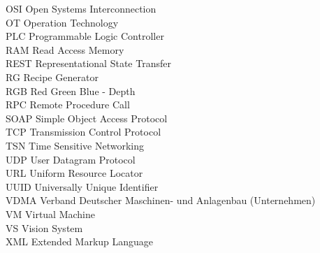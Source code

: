 \begin{tabbing}
OSI     \>  Open Systems Interconnection\\
OT  \> Operation Technology\\
PLC  \> Programmable Logic Controller\\
RAM    \> Read Access Memory \\
REST    \> Representational State Transfer \\
RG    \> Recipe Generator \\
RGB    \> Red Green Blue - Depth \\
RPC    \> Remote Procedure Call \\
SOAP	 \> 	Simple Object Access Protocol	 \\
TCP	 \> 	Transmission Control Protocol	 \\
TSN	 \> 	Time Sensitive Networking	 \\
UDP	 \> 	User Datagram Protocol	 \\
URL	 \> 	Uniform Resource Locator	 \\
UUID	 \> 	Universally Unique Identifier	 \\
VDMA \>     Verband Deutscher Maschinen- und Anlagenbau (Unternehmen) \\
VM	 \> 	Virtual Machine	 \\
VS  \>  Vision System\\
XML  \>  Extended Markup Language\\
\end{tabbing}
\endinput
